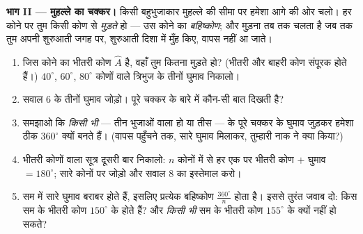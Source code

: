 \begin{problem}
\medskip
\noindent\textbf{भाग II --- मुहल्ले का चक्कर।}
किसी बहुभुजाकार मुहल्ले की सीमा पर हमेशा आगे की ओर चलो। हर कोने
पर तुम किसी कोण से \emph{मुड़ते} हो --- उस कोने का \emph{बहिष्कोण};
और मुड़ना तब तक चलता है जब तक तुम अपनी शुरुआती जगह पर, शुरुआती
दिशा में मुँह किए, वापस नहीं आ जाते।
\begin{enumerate}[resume]
  \item जिस कोने का भीतरी कोण $\widehat A$ है, वहाँ तुम कितना
        मुड़ते हो? (भीतरी और बाहरी कोण संपूरक होते हैं।)
        $40^\circ$, $60^\circ$, $80^\circ$ कोणों वाले त्रिभुज के
        तीनों घुमाव निकालो।
  \item सवाल 6 के तीनों घुमाव जोड़ो। पूरे चक्कर के बारे में कौन-सी
        बात दिखती है?
  \item समझाओ कि \emph{किसी भी}  --- तीन भुजाओं वाला हो या
        तीस --- के पूरे चक्कर के घुमाव जुड़कर हमेशा ठीक
        $360^\circ$ क्यों बनते हैं। (वापस पहुँचने तक, सारे घुमाव
        मिलाकर, तुम्हारी नाक ने क्या किया?)
  \item भीतरी कोणों वाला सूत्र दूसरी बार निकालो: $n$ कोनों में से
        हर एक पर भीतरी कोण $+$ घुमाव $= 180^\circ$; सारे कोनों पर
        जोड़ो और सवाल 8 का इस्तेमाल करो।
  \item सम  में सारे घुमाव बराबर होते हैं, इसलिए प्रत्येक
        बहिष्कोण $\frac{360^\circ}{n}$ होता है। इससे तुरंत जवाब
        दो: किस सम  के भीतरी कोण $150^\circ$ के होते हैं?
        और \emph{किसी भी} सम  के भीतरी कोण $155^\circ$ के
        क्यों नहीं हो सकते?
\end{enumerate}


\end{problem}
